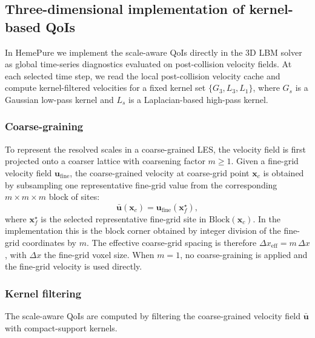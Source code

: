 \documentclass[]{elsarticle}
\begin{document}
\subsection{Three-dimensional implementation of kernel-based QoIs}
In HemePure we implement the scale-aware QoIs directly in the 3D LBM solver as global time-series diagnostics evaluated on post-collision velocity fields. At each selected time step, we read the local post-collision velocity cache and compute kernel-filtered velocities for a fixed kernel set $\{G_3, L_3, L_1\}$, where $G_s$ is a Gaussian low-pass kernel and $L_s$ is a Laplacian-based high-pass kernel.

\subsubsection{Coarse-graining}
To represent the resolved scales in a coarse-grained LES, the velocity field is first projected onto a coarser lattice with coarsening factor $m \geq 1$. Given a fine-grid velocity field $\boldsymbol{u}_{\text{fine}}$, the coarse-grained velocity at coarse-grid point $\boldsymbol{x}_c$ is obtained by subsampling one representative fine-grid value from the corresponding $m \times m \times m$ block of sites:
\begin{equation}
    \bar{\boldsymbol{u}}(\boldsymbol{x}_c) = \boldsymbol{u}_{\text{fine}}(\boldsymbol{x}_f^{\star}),
\end{equation}
where $\boldsymbol{x}_f^{\star}$ is the selected representative fine-grid site in $\text{Block}(\boldsymbol{x}_c)$. In the implementation this is the block corner obtained by integer division of the fine-grid coordinates by $m$. The effective coarse-grid spacing is therefore $\Delta x_{\mathrm{eff}} = m\,\Delta x$, with $\Delta x$ the fine-grid voxel size. When $m = 1$, no coarse-graining is applied and the fine-grid velocity is used directly.

\subsubsection{Kernel filtering}
The scale-aware QoIs are computed by filtering the coarse-grained velocity field $\bar{\boldsymbol{u}}$ with compact-support kernels. 
\end{document}
